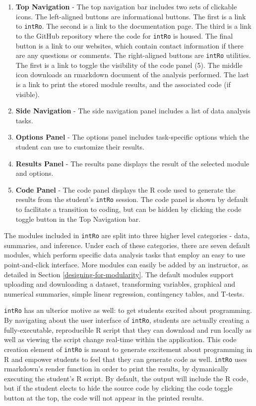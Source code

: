 \documentclass[12pt,]{article}
\providecommand{\tightlist}{%
  \setlength{\itemsep}{0pt}\setlength{\parskip}{0pt}}
\begin{document}
\begin{enumerate}
\def\labelenumi{\arabic{enumi}.}
\tightlist
\item
  \textbf{Top Navigation} - The top navigation bar includes two sets of
  clickable icons. The left-aligned buttons are informational buttons.
  The first is a link to \texttt{intRo}. The second is a link to the
  documentation page. The third is a link to the GitHub repository where
  the code for \texttt{intRo} is housed. The final button is a link to
  our websites, which contain contact information if there are any
  questions or comments. The right-aligned buttons are \texttt{intRo}
  utilities. The first is a link to toggle the visibility of the code
  panel (5). The middle icon downloads an rmarkdown document of the
  analysis performed. The last is a link to print the stored module
  results, and the associated code (if visible).
\item
  \textbf{Side Navigation} - The side navigation panel includes a list
  of data analysis tasks.
\item
  \textbf{Options Panel} - The options panel includes task-specific
  options which the student can use to customize their results.
\item
  \textbf{Results Panel} - The results pane displays the result of the
  selected module and options.
\item
  \textbf{Code Panel} - The code panel displays the R code used to
  generate the results from the student's \texttt{intRo} session. The
  code panel is shown by default to facilitate a transition to coding,
  but can be hidden by clicking the code toggle button in the Top
  Navigation bar.
\end{enumerate}

The modules included in \texttt{intRo} are split into three higher level
categories - data, summaries, and inference. Under each of these
categories, there are seven default modules, which perform specific data
analysis tasks that employ an easy to use point-and-click interface.
More modules can easily be added by an instructor, as detailed in
Section \ref{designing-for-modularity}. The default modules support
uploading and downloading a dataset, transforming variables, graphical
and numerical summaries, simple linear regression, contingency tables,
and T-tests.

\texttt{intRo} has an ulterior motive as well: to get students excited
about programming. By navigating about the user interface of
\texttt{intRo}, students are actually creating a fully-executable,
reproducible R script that they can download and run locally as well as
viewing the script change real-time within the application. This code
creation element of \texttt{intRo} is meant to generate excitement about
programming in R and empower students to feel that they can generate
code as well. \texttt{intRo} uses rmarkdown's render function in order
to print the results, by dymanically executing the student's R script.
By default, the output will include the R code, but if the student
elects to hide the source code by clicking the code toggle button at the
top, the code will not appear in the printed results.
\end{document}
